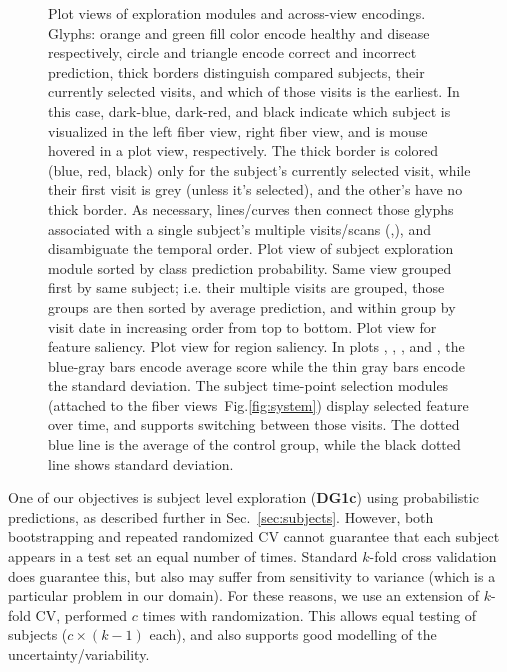\begin{figure}[t]
\caption{Plot views of exploration modules and across-view encodings. Glyphs: orange and green fill color encode healthy and disease respectively, circle and triangle encode correct and incorrect prediction, thick borders distinguish compared subjects, their currently selected visits, and which of those visits is the earliest. In this case, dark-blue, dark-red, and black indicate which subject is visualized in the left fiber view, right fiber view, and is mouse hovered in a plot view, respectively. The thick border is colored (blue, red, black) only for the subject's currently selected visit, while their first visit is grey (unless it's selected), and the other's have no thick border. As necessary, lines/curves then connect those glyphs associated with a single subject's multiple visits/scans (,), and disambiguate the temporal order.  Plot view of subject exploration module sorted by class prediction probability.  Same view grouped first by same subject; i.e. their multiple visits are grouped, those groups are then sorted by average prediction, and within group by visit date in increasing order from top to bottom.  Plot view for feature saliency.  Plot view for region saliency. In plots , , , and , the blue-gray bars encode average score while the thin gray bars encode the standard deviation.  The subject time-point selection modules (attached to the fiber views~Fig.\ref{fig:system}) display selected feature over time, and supports switching between those visits. The dotted blue line is the average of the control group, while the black dotted line shows standard deviation.}
\label{fig:subjectsUncertainty}
\end{figure}

One of our objectives is subject level exploration (\textbf{DG1c}) using probabilistic predictions, as described further in Sec.~\ref{sec:subjects}. However, both bootstrapping and repeated randomized CV cannot guarantee that each subject appears in a test set an equal number of times. Standard $k$-fold cross validation does guarantee this, but also may suffer from sensitivity to variance (which is a particular problem in our domain). For these reasons, we use an extension of $k$-fold CV, performed $c$ times with randomization. This allows equal testing of subjects ($c \times (k-1)$ each), and also supports good modelling of the uncertainty/variability. 

